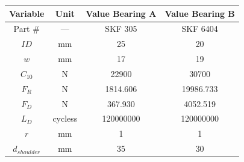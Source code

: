 \begin{tabular}{|c|c|c|c|}
\hline
Variable & Unit & Value Bearing A & Value Bearing B \\ \hline

Part \# & --- & SKF 305 & SKF 6404 \\ \hline
$ID$ & mm & 25 & 20 \\ \hline
$w$ & mm & 17 & 19 \\ \hline
$C_{10}$ & N & 22900 & 30700 \\ \hline
$F_R$ & N & 1814.606 & 19986.733 \\ \hline
$F_D$ & N & 367.930 & 4052.519 \\ \hline
$L_D$ & cycless & 120000000 & 120000000 \\ \hline
$r$ & mm & 1 & 1 \\ \hline
$d_{shoulder}$ & mm & 35 & 30 \\ \hline

\end{tabular}
